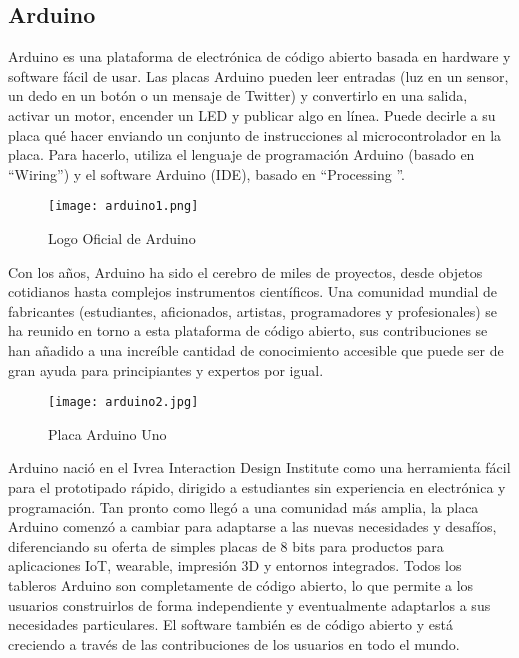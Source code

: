 \subsection{Arduino}

\par
Arduino es una plataforma de electrónica de código abierto basada en hardware y software fácil de usar. Las placas Arduino pueden leer entradas (luz en un sensor, un dedo en un botón o un mensaje de Twitter) y convertirlo en una salida, activar un motor, encender un LED y publicar algo en línea. Puede decirle a su placa qué hacer enviando un conjunto de instrucciones al microcontrolador en la placa. Para hacerlo, utiliza el lenguaje de programación Arduino (basado en \textquotedblleft Wiring\textquotedblright) y el software Arduino (IDE), basado en \textquotedblleft Processing \textquotedblright\cite{arduino-intro}.

\begin{figure}[H]
	\centering
	\texttt{[image: arduino1.png]}
	\caption{Logo Oficial de Arduino}
\end{figure}

\par \noindent
Con los años, Arduino ha sido el cerebro de miles de proyectos, desde objetos cotidianos hasta complejos instrumentos científicos. Una comunidad mundial de fabricantes (estudiantes, aficionados, artistas, programadores y profesionales) se ha reunido en torno a esta plataforma de código abierto, sus contribuciones se han añadido a una increíble cantidad de conocimiento accesible que puede ser de gran ayuda para principiantes y expertos por igual\cite{arduino-intro}.

\begin{figure}[H]
	\centering
	\texttt{[image: arduino2.jpg]}
	\caption{Placa Arduino Uno}
\end{figure}

\par \noindent
Arduino nació en el Ivrea Interaction Design Institute como una herramienta fácil para el prototipado rápido, dirigido a estudiantes sin experiencia en electrónica y programación. Tan pronto como llegó a una comunidad más amplia, la placa Arduino comenzó a cambiar para adaptarse a las nuevas necesidades y desafíos, diferenciando su oferta de simples placas de 8 bits para productos para aplicaciones IoT, wearable, impresión 3D y entornos integrados. Todos los tableros Arduino son completamente de código abierto, lo que permite a los usuarios construirlos de forma independiente y eventualmente adaptarlos a sus necesidades particulares. El software también es de código abierto y está creciendo a través de las contribuciones de los usuarios en todo el mundo\cite{arduino-intro}.

